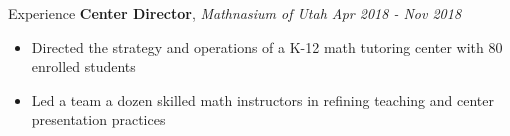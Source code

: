 \documentclass{resume/resume}
\begin{document}
\begin{rSection}{Experience}
    {\bf Center Director}, {\em Mathnasium of Utah \hfill Apr 2018 - Nov 2018}
    \vspace{-6pt}
    \begin{itemize}[nosep]
        \item Directed the strategy and operations of a K-12 math tutoring center with 80 enrolled students
        \item Led a team a dozen skilled math instructors in refining teaching and center presentation practices
    \end{itemize}
    

%    
    
\end{rSection}
\end{document}
